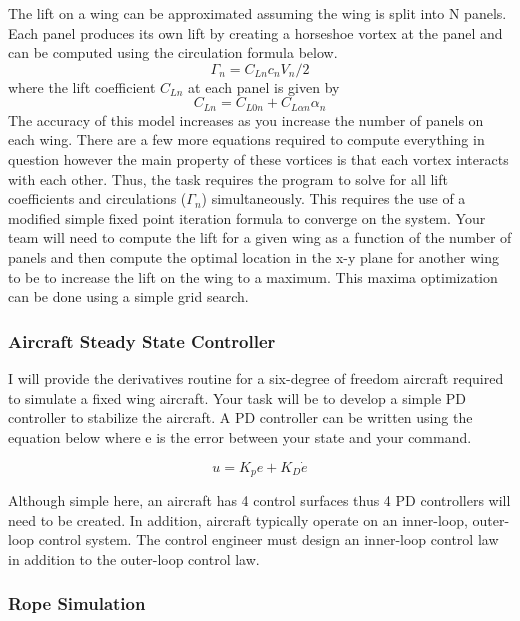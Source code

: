 The lift on a wing can be approximated assuming the wing is split into
N panels. Each panel produces its own lift by creating a horseshoe
vortex at the panel and can be computed using the circulation formula
below. 
\begin{equation}\label{e:kutta}
  \Gamma_n = C_{Ln} c_n V_{n}/2
\end{equation}
where the lift coefficient $C_{Ln}$ at each panel is given by 
\begin{equation}\label{e:liftdrag}
C_{Ln} = C_{L0n} + C_{L\alpha n}\alpha_n
\end{equation}
The accuracy of this model increases as you increase the number of
panels on each wing. There are a few more equations required to
compute everything in question however the main property of these
vortices is that each vortex interacts with each other. Thus, the task
requires the program to solve for all lift coefficients and
circulations ($\Gamma_n$) simultaneously. This requires the use of a
modified simple fixed point iteration formula to converge on the
system. Your team will need to compute the lift for a given wing as a
function of the number of panels and then compute the optimal location in the x-y
plane for another wing to be to increase the lift on the wing to a
maximum. This maxima optimization can be done using a simple grid
search. 

\subsubsection{Aircraft Steady State Controller}

I will provide the derivatives routine for a six-degree of freedom aircraft
required to simulate a fixed wing aircraft. Your task will be to
develop a simple PD controller to stabilize the aircraft. A PD
controller can be written using the equation below where e is the
error between your state and your command.

\begin{equation}
u = K_p e + K_D \dot{e}
\end{equation}

Although simple here, an aircraft has 4 control surfaces thus 4 PD
controllers will need to be created. In addition, aircraft typically
operate on an inner-loop, outer-loop control system. The control
engineer must design an inner-loop control law in addition to the
outer-loop control law. 

\subsubsection{Rope Simulation}

